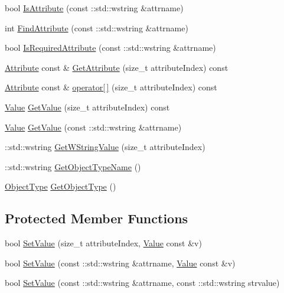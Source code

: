 \begin{DoxyCompactItemize}
bool \hyperlink{class_n_m_1_1_o_d_b_1_1_c_graph_object_a204a1a4e1c62ea074aa0e3183a031759}{Is\+Attribute} (const \+::std\+::wstring \&attrname)
\item 
int \hyperlink{class_n_m_1_1_o_d_b_1_1_c_graph_object_a5d3cc425d5b4d482ee94936f9224670d}{Find\+Attribute} (const \+::std\+::wstring \&attrname)
\item 
bool \hyperlink{class_n_m_1_1_o_d_b_1_1_c_graph_object_ac6caa398d4ff96211a0e704c77da7739}{Is\+Required\+Attribute} (const \+::std\+::wstring \&attrname)
\item 
\hyperlink{class_n_m_1_1_o_d_b_1_1_attribute}{Attribute} const \& \hyperlink{class_n_m_1_1_o_d_b_1_1_c_graph_object_a291fcbb04bfa5fb1ad20535ffa6001fc}{Get\+Attribute} (size\+\_\+t attribute\+Index) const 
\item 
\hyperlink{class_n_m_1_1_o_d_b_1_1_attribute}{Attribute} const \& \hyperlink{class_n_m_1_1_o_d_b_1_1_c_graph_object_a1e1680665f362ad704ae39061e43de9f}{operator\mbox{[}$\,$\mbox{]}} (size\+\_\+t attribute\+Index) const 
\item 
\hyperlink{class_n_m_1_1_o_d_b_1_1_value}{Value} \hyperlink{class_n_m_1_1_o_d_b_1_1_c_graph_object_ab6c7879bcf22d59445eb237d9b8ce246}{Get\+Value} (size\+\_\+t attribute\+Index) const 
\item 
\hyperlink{class_n_m_1_1_o_d_b_1_1_value}{Value} \hyperlink{class_n_m_1_1_o_d_b_1_1_c_graph_object_aea1695fee8940d9c6a97b9d647d87c2c}{Get\+Value} (const \+::std\+::wstring \&attrname)
\item 
\+::std\+::wstring \hyperlink{class_n_m_1_1_o_d_b_1_1_c_graph_object_a6295db63db8cee39492f6c955078b605}{Get\+W\+String\+Value} (size\+\_\+t attribute\+Index)
\item 
\+::std\+::wstring \hyperlink{class_n_m_1_1_o_d_b_1_1_c_graph_object_ae848454b3bcb590d24b7cbe864f8eaaa}{Get\+Object\+Type\+Name} ()
\item 
\hyperlink{namespace_n_m_1_1_o_d_b_ac9f60beb4a1c8a6240dd0c8baa281345}{Object\+Type} \hyperlink{class_n_m_1_1_o_d_b_1_1_c_graph_object_ab0da8988916c6c8e2376f0c0e4ae22df}{Get\+Object\+Type} ()
\end{DoxyCompactItemize}
\subsection*{Protected Member Functions}
\begin{DoxyCompactItemize}
\item 
bool \hyperlink{class_n_m_1_1_o_d_b_1_1_c_graph_object_a08b23d43253a196f369b8563eb113f94}{Set\+Value} (size\+\_\+t attribute\+Index, \hyperlink{class_n_m_1_1_o_d_b_1_1_value}{Value} const \&v)
\item 
bool \hyperlink{class_n_m_1_1_o_d_b_1_1_c_graph_object_afacbf41e9fb2e87d5aeaaa8b46259815}{Set\+Value} (const \+::std\+::wstring \&attrname, \hyperlink{class_n_m_1_1_o_d_b_1_1_value}{Value} const \&v)
\item 
bool \hyperlink{class_n_m_1_1_o_d_b_1_1_c_graph_object_a857d52bf7ad89fdcef601721eaeb627b}{Set\+Value} (const \+::std\+::wstring \&attrname, const \+::std\+::wstring strvalue)
\end{DoxyCompactItemize}


